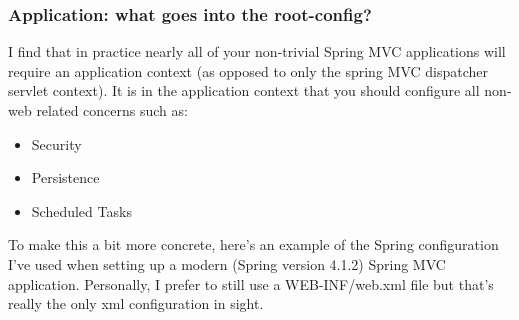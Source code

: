\subsubsection{Application: what goes into the root-config?}


I find that in practice nearly all of your non-trivial Spring MVC applications will require an application context (as opposed to only the spring MVC dispatcher servlet context). It is in the application context that you should configure all non-web related concerns such as:

\begin{itemize}
    \item Security
    \item Persistence
    \item Scheduled Tasks
\end{itemize}

To make this a bit more concrete, here's an example of the Spring configuration I've used when setting up a modern (Spring version 4.1.2) Spring MVC application. Personally, I prefer to still use a WEB-INF/web.xml file but that's really the only xml configuration in sight.

